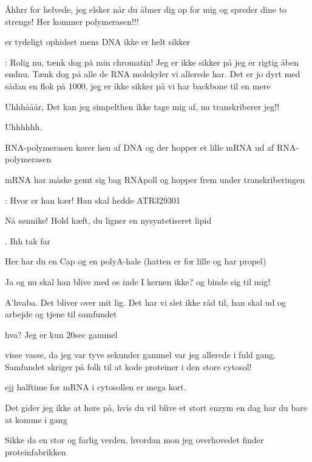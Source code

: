 \documentclass[a4paper,11pt]{article}
\begin{document}
\begin{sketch}


 Åhhrr for helvede, jeg elsker når du åbner dig op for mig og spreder dine to strenge! Her kommer polymerasen!!!


 er tydeligt ophidset mens DNA ikke er helt sikker


: Rolig nu, tænk dog på min chromatin! Jeg er ikke sikker på jeg er rigtig åben endnu. Tænk dog på alle de RNA molekyler vi allerede har. Det er jo dyrt med sådan en flok på 1000, jeg er ikke sikker på vi har backbone til en mere


Uhhhååår, Det kan jeg simpelthen ikke tage mig af, nu transkriberer jeg!!


 Uhhhhhh.


\scene RNA-polymerasen kører hen af DNA og der hopper et lille mRNA ud af RNA-polymerasen


\scene mRNA har måske gemt sig bag RNApoll og hopper frem under transkriberingen


: Hvor er han kær! Han skal hedde ATR329301


 Nå sønnike! Hold kæft, du ligner en nysyntetiseret lipid 


. Ihh tak far


 Her har du en Cap og en polyA-hale (hatten er for lille og har propel)


 Ja og nu skal han blive med os inde I kernen ikke? og binde sig til mig!


 A’hvaba. Det bliver over mit lig. Det har vi slet ikke råd til, han skal ud og arbejde og tjene til samfundet


 hva? Jeg er kun 20sec gammel


 visse vasse, da jeg var tyve sekunder gammel var jeg allerede i fuld gang. Samfundet skriger på folk til at kode proteiner i den store cytosol!


 ejj halftime for mRNA i cytosollen er mega kort.


 Det gider jeg ikke at høre på, hvis du vil blive et stort enzym en dag har du bare at komme i gang




 Sikke da en stor og farlig verden, hvordan mon jeg overhovedet finder proteinfabrikken



\end{sketch}
\end{document}
